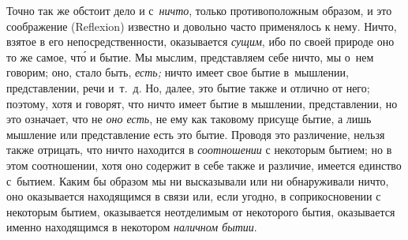 Точно так же обстоит дело и с~{\em ничто}, только противоположным образом,
и это соображение (Reflexion) известно и довольно часто применялось к нему.
Ничто, взятое в его непосредственности, оказывается {\em сущим}, ибо по своей
природе оно то же самое, чт\'{о} и бытие. Мы мыслим, представляем себе ничто,
мы о~нем говорим; оно, стало быть, {\em есть;} ничто имеет свое бытие
в~мышлении, представлении, речи и~т.~д. Но, далее, это бытие также и отлично от
него; поэтому, хотя и говорят, что ничто имеет бытие в мышлении, представлении,
но это означает, что не {\em оно есть}, не ему как таковому присуще бытие, а
лишь мышление или представление есть это бытие. Проводя это различение, нельзя
также отрицать, что ничто находится в {\em соотношении} с некоторым бытием; но
в этом соотношении, хотя оно содержит в себе также и различие, имеется единство
с~бытием. Каким бы образом мы ни высказывали или ни обнаруживали ничто, оно
оказывается находящимся в связи или, если угодно, в соприкосновении с некоторым
бытием, оказывается неотделимым от некоторого бытия, оказывается именно
находящимся в некотором {\em наличном бытии}.

